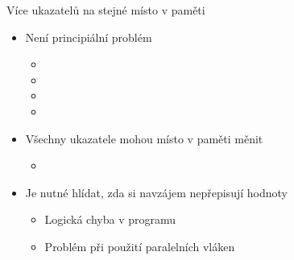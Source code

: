 \begin{frame}{Více ukazatelů na stejné místo v paměti}

  \begin{itemize}
    \item Není principiální problém
    \begin{itemize}
      \item {}
      \item {}
      \item {}
      \item {}
    \end{itemize}

    \pause

    \item Všechny ukazatele mohou místo v paměti měnit
    \begin{itemize}
      \item {}
    \end{itemize}

    \pause

    \item Je nutné hlídat, zda si navzájem nepřepisují hodnoty
    \begin{itemize}
      \item Logická chyba v programu
      \item Problém při použití paralelních vláken
    \end{itemize}

  \end{itemize}

\end{frame}

